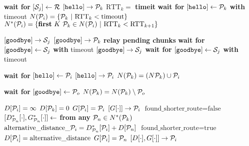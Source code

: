 \documentclass{article}
\begin{document}
\pagestyle{empty}

\newcommand{\send}{\Rightarrow}
\newcommand{\sendto}{\rightarrow}
\algrenewcommand{}

\begin{algorithmic}

  \State \textbf{wait for} $[{\cal S}_j] \gets {\cal R}$
  \State $[\mathtt{hello}] \sendto {\cal P}_k$
  \State $\text{RTT}_k=$ \textbf{timeit} \textbf{wait for} $[\mathtt{hello}] \gets {\cal P}_k$ \textbf{with} timeout
  \EndFor
  \State $N({\cal P}_i)=\{{\cal P}_k~|~\text{RTT}_k<\text{timeout}\}$
  \State $N^*({\cal P}_i)=\{\textbf{first}~K~{\cal P}_k \in N({\cal P}_i)~|~\text{RTT}_k < \text{RTT}_{k+1}\}$
  \EndProcedure
  
  \State $[\mathtt{goodbye}] \sendto {\cal S}_j$
  $[\mathtt{goodbye}] \sendto {\cal P}_k$
  \EndFor
  \State \textbf{relay pending chunks}
  \State \textbf{wait for} $[\mathtt{goodbye}] \gets {\cal S}_j$ \textbf{with} timeout
  \State $[\mathtt{goodbye}] \sendto {\cal S}_j$
  \State \textbf{wait for} $[\mathtt{goodbye}] \gets {\cal S}_j$ \textbf{with} timeout
  \EndWhile
  \EndProcedure

  \State \textbf{wait for} $[\mathtt{hello}] \gets {\cal P}_i$
  \State $[\mathtt{hello}] \sendto {\cal P}_i$
  \State $N({\cal P}_k) = (N{\cal P}_k) \cup {\cal P}_i$
  \EndWhile
  \EndProcedure

  \State \textbf{wait for} $[\mathtt{goodbye}] \gets {\cal P}_o$
  \State $N({\cal P}_k)=N({\cal P}_k) \setminus {\cal P}_o$
  \EndWhile
  \EndProcedure

  \State $D[{\cal P}_i] = \infty$
  \EndFor
  \State $D[{\cal P}_k] = 0$
  \State $G[{\cal P}_i] = {\cal P}_i$
  \EndFor
  \State $[G[\cdot]] \sendto {\cal P}_i$
  \EndFor
  \State $\text{found\_shorter\_route} = \text{false}$
  \State $[D_{{\cal P}_n}^*[\cdot],G_{{\cal P}_n}^*[\cdot]] \gets$ \textbf{from any} ${\cal P}_n \in N^*({\cal P}_k)$
  \State $\text{alternative\_distance}\_{\cal P}_i = D_{{\cal P}_n}^*[{\cal P}_i] + D[{\cal P}_n]$
  \State $\text{found\_shorter\_route} = \text{true}$
  \State $D[{\cal P}_i] = \text{alternative\_distance}$
  \State $G[{\cal P}_i] = {\cal P}_n$
  \EndIf
  \EndFor
  \State $[D[\cdot],G[\cdot]] \sendto {\cal P}_i$
  \EndFor
  \EndIf
  \EndWhile
  \EndProcedure


\end{algorithmic}
\end{document}

